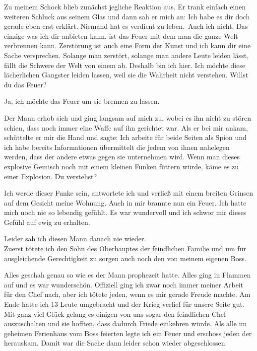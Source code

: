 \documentclass[11pt, a5paper]{article}
\newcommand{\nL}{Niemand hat es verdient zu leben.}
\begin{document}
\begin{spacing}{1.2}
		Zu meinem Schock blieb zunächst jegliche Reaktion aus. Er trank einfach einen weiteren Schluck aus seinem Glas und dann sah er mich an: \frqq Ich habe es dir doch gerade eben erst erklärt. \nL\ Auch ich nicht. Das einzige was ich dir anbieten kann, ist das Feuer mit dem man die ganze Welt verbrennen kann. Zerstörung ist auch eine Form der Kunst und ich kann dir eine Sache versprechen. Solange man zerstört, solange man andere Leute leiden lässt, fällt die Schwere der Welt von einem ab. Deshalb bin ich hier. Ich möchte diese lächerlichen Gangster leiden lassen, weil sie die Wahrheit nicht verstehen. Willst du das Feuer?\flqq
		
		\frqq Ja, ich möchte das Feuer um sie brennen zu lassen.\flqq
		
		Der Mann erhob sich und ging langsam auf mich zu, wobei es ihn nicht zu stören schien, dass noch immer eine Waffe auf ihn gerichtet war. Als er bei mir ankam, schüttelte er mir die Hand und sagte: \frqq Ich arbeite für beide Seiten als Spion und ich habe bereits Informationen übermittelt die jedem von ihnen nahelegen werden, dass der andere etwas gegen sie unternehmen wird. Wenn man dieses explosive Gemisch noch mit einem kleinen Funken füttern würde, käme es zu einer Explosion. Du verstehst?\flqq
		
		\frqq Ich werde dieser Funke sein\flqq, antwortete ich und verließ mit einem breiten Grinsen auf dem Gesicht meine Wohnung. Auch in mir brannte nun ein Feuer. Ich hatte mich noch nie so lebendig gefühlt. Es war wundervoll und ich schwor mir dieses Gefühl auf ewig zu erhalten.
		
		Leider sah ich diesen Mann danach nie wieder.\\
		
		Zuerst tötete ich den Sohn des Oberhauptes der feindlichen Familie und um für ausgleichende Gerechtigkeit zu sorgen auch noch den von meinem eigenen Boss.
		
		Alles geschah genau so wie es der Mann prophezeit hatte. Alles ging in Flammen auf und es war wunderschön. Offiziell ging ich zwar noch immer meiner Arbeit für den Chef nach, aber ich tötete jeden, wenn es mir gerade Freude machte. Am Ende hatte ich 13 Leute umgebracht und der Krieg verlief für unsere Seite gut. Mit ganz viel Glück gelang es einigen von uns sogar den feindlichen Chef auszuschalten und sie hofften, dass dadurch Friede einkehren würde. Als alle im geheimen Ferienhaus vom Boss feierten legte ich ein Feuer und erschoss jeden der herauskam. Damit war die Sache dann leider schon wieder abgeschlossen.
		

\end{spacing}
\end{document}
